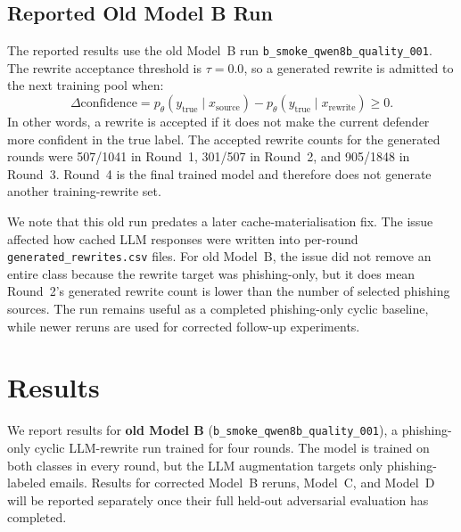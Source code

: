 \subsection{Reported Old Model B Run}
The reported results use the old Model~B run \texttt{b\_smoke\_qwen8b\_quality\_001}. The rewrite acceptance threshold is $\tau=0.0$, so a generated rewrite is admitted to the next training pool when:
\[
  \Delta \text{confidence}
  =
  p_\theta(y_{\mathrm{true}}\mid x_{\mathrm{source}})
  -
  p_\theta(y_{\mathrm{true}}\mid x_{\mathrm{rewrite}})
  \geq 0.
\]
In other words, a rewrite is accepted if it does not make the current defender more confident in the true label. The accepted rewrite counts for the generated rounds were 507/1041 in Round~1, 301/507 in Round~2, and 905/1848 in Round~3. Round~4 is the final trained model and therefore does not generate another training-rewrite set.

We note that this old run predates a later cache-materialisation fix. The issue affected how cached LLM responses were written into per-round \texttt{generated\_rewrites.csv} files. For old Model~B, the issue did not remove an entire class because the rewrite target was phishing-only, but it does mean Round~2's generated rewrite count is lower than the number of selected phishing sources. The run remains useful as a completed phishing-only cyclic baseline, while newer reruns are used for corrected follow-up experiments.




\section{Results}
\label{sec:results}

We report results for \textbf{old Model B} (\texttt{b\_smoke\_qwen8b\_quality\_001}), a phishing-only cyclic LLM-rewrite run trained for four rounds. The model is trained on both classes in every round, but the LLM augmentation targets only phishing-labeled emails. Results for corrected Model~B reruns, Model~C, and Model~D will be reported separately once their full held-out adversarial evaluation has completed.
